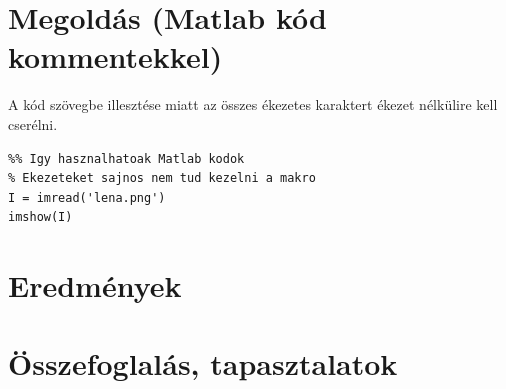 \documentclass[paper=letter, fontsize=12pt]{article}
\begin{document}
\section{Megoldás (Matlab kód kommentekkel)}
A kód szövegbe illesztése miatt az összes ékezetes karaktert ékezet nélkülire kell cserélni.

\begin{lstlisting}
%% Igy hasznalhatoak Matlab kodok
% Ekezeteket sajnos nem tud kezelni a makro
I = imread('lena.png')
imshow(I)

\end{lstlisting}

\section{Eredmények}

\section{Összefoglalás, tapasztalatok}
\end{document}

